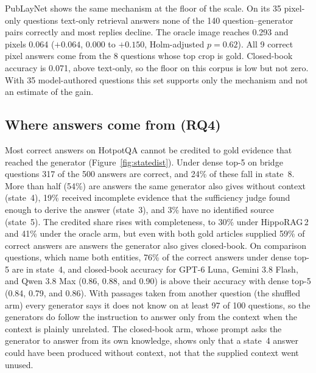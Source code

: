 \documentclass[preprint,12pt]{elsarticle}
\newif\ifdraftnotes
\newcommand{\note}[1]{\ifdraftnotes\par\smallskip\noindent\fcolorbox{black!40}{black!4}{\parbox{\dimexpr\linewidth-2\fboxsep-2\fboxrule}{\footnotesize\textbf{Writer note.} #1}}\par\smallskip\fi}
\begin{document}
PubLayNet shows the same mechanism at the floor of the scale. On its 35 pixel-only
questions text-only retrieval answers none of the 140 question--generator pairs
correctly and most replies decline. The oracle image reaches 0.293 and pixels
0.064 ($+0.064$, $0.000$ to $+0.150$, Holm-adjusted $p=0.62$). All 9 correct pixel
answers come from the 8 questions whose top crop is gold. Closed-book accuracy is
0.071, above text-only, so the floor on this corpus is low but not zero. With 35
model-authored questions this set supports
only the mechanism and not an estimate of the gain.

\note{The previous version's 25/34 versus $n=35$ denominator must not
reappear: every cell states its own $n$, and an unscorable item is named in
the caption.}

\subsection{Where answers come from (RQ4)}
\label{sec:res-states}



Most correct answers on HotpotQA cannot be credited to gold evidence that
reached the generator (Figure~\ref{fig:statedist}). Under dense top-5 on
bridge questions 317 of the 500 answers are correct, and 24\% of these fall in
state~8. More than half (54\%) are answers the same generator also gives
without context (state~4), 19\% received incomplete evidence that the
sufficiency judge found enough to derive the answer (state~3), and 3\% have no
identified source (state~5). The credited share
rises with completeness, to 30\% under HippoRAG\,2 and 41\% under the oracle
arm, but even with both gold articles supplied 59\% of correct answers are
answers the generator also gives closed-book. On comparison questions, which
name both entities, 76\% of the correct answers under dense top-5 are in
state~4, and closed-book accuracy for GPT-6 Luna, Gemini 3.8 Flash, and Qwen 3.8
Max (0.86, 0.88, and 0.90) is above their accuracy with dense top-5 (0.84, 0.79,
and 0.86). With passages taken from another question (the shuffled arm) every
generator says it does not know on at least 97 of 100 questions, so the
generators do follow the instruction to answer only from the context when the
context is plainly unrelated. The closed-book arm, whose prompt asks the
generator to answer from its own knowledge, shows only that a state~4 answer
could have been produced without context, not that the supplied context went
unused.
\end{document}
